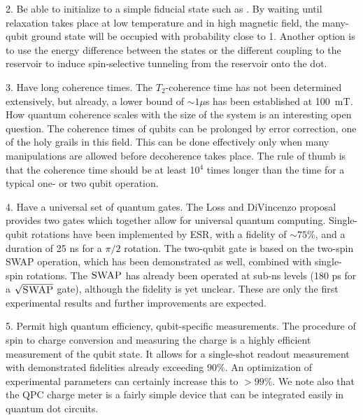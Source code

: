 \documentclass[rmp,twocolumn,aps]{revtex4}
\begin{document}
2. Be able to initialize to a simple fiducial state such as .
By waiting until relaxation takes place at low temperature and in high magnetic field, the many-qubit ground state will be occupied with probability close to 1. Another option is to use the energy difference between the states or the different coupling to the reservoir to induce spin-selective tunneling from the reservoir onto the dot.

3. Have long coherence times. The $T_{2}$-coherence time has not been
determined extensively, but already, a lower bound of $\sim 1 \mu$s has been established at 100~mT. How quantum coherence scales with the size of the system is an interesting open question. The coherence times of qubits can be prolonged by error correction, one of the holy grails in this field. This can be done effectively only when many manipulations are allowed before decoherence takes place. The rule of thumb is that the coherence time should be at least 10$^4$ times longer than the time for a typical one- or two qubit operation.
 
4. Have a universal set of quantum gates. The Loss and DiVincenzo proposal provides two gates which together allow for universal quantum computing. Single-qubit rotations have been implemented by ESR, with a fidelity of $\sim 75\%$, and a duration of 25 ns for a $\pi/2$ rotation. The two-qubit gate is based on the two-spin \mbox{\sc SWAP} operation, which has been demonstrated as well, combined with single-spin rotations. The $\mbox{\sc SWAP}$ has already been operated at sub-ns levels (180 ps for a $\sqrt{\mbox{\sc SWAP}}$ gate), although the fidelity is yet unclear. These are only the first experimental results and further improvements are expected.

5. Permit high quantum efficiency, qubit-specific measurements. The procedure of spin to charge conversion and measuring the charge is a highly efficient measurement of the qubit state. It allows for a single-shot readout measurement with demonstrated fidelities already exceeding $90\%$. An optimization of experimental parameters can certainly increase this to $>99\%$. 
We note also that the QPC charge meter is a fairly
simple device that can be integrated easily in quantum dot
circuits.
\end{document}
